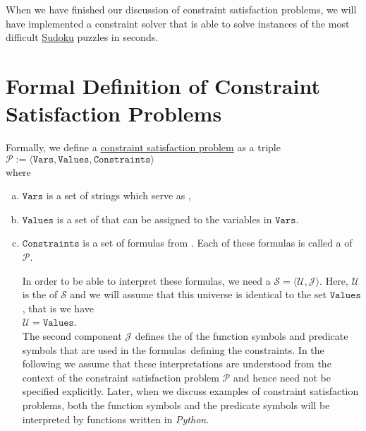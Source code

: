 When we have finished our discussion of constraint satisfaction problems, we will have implemented a
constraint solver that is able to solve instances of the most difficult
\href{https://en.wikipedia.org/wiki/Sudoku}{Sudoku} puzzles in seconds.

\section[Formal Definition of \textsc{Csp}s]{Formal Definition of Constraint Satisfaction Problems}
Formally, we define a 
\href{https://en.wikipedia.org/wiki/Constraint_satisfaction_problem}{constraint satisfaction problem} as a triple
\\[0.2cm]
\hspace*{1.3cm}
$\mathcal{P} := \langle \texttt{Vars}, \texttt{Values}, \texttt{Constraints} \rangle$
\\[0.2cm]
where 
\begin{enumerate}[(a)]
\item $\texttt{Vars}$ is a set of strings which serve as ,
\item $\texttt{Values}$ is a set of  that can be assigned to the variables in $\texttt{Vars}$.
\item $\texttt{Constraints}$ is a set of formulas from .  Each of these formulas is
      called a  of $\mathcal{P}$.

      In order to be able to interpret these formulas, we need a  $\mathcal{S} = \langle \mathcal{U}, \mathcal{J} \rangle$.  
      Here, $\mathcal{U}$ is the  of $\mathcal{S}$ and we will assume that this
      universe is identical to the set $\texttt{Values}$, that is we have
      \\[0.2cm]
      \hspace*{1.3cm}
      $\mathcal{U} = \texttt{Values}$.
      \\[0.2cm]
      The second component $\mathcal{J}$ defines the
       of the function symbols and predicate symbols that are used in the formulas\
      defining the constraints.  In the following we assume that these interpretations are understood from the
      context of the constraint satisfaction problem $\mathcal{P}$ and hence need not be specified explicitly.
      Later, when we discuss examples of constraint 
      satisfaction problems, both the function symbols and the predicate symbols will be interpreted
      by functions written in \textsl{Python}.
\end{enumerate}
